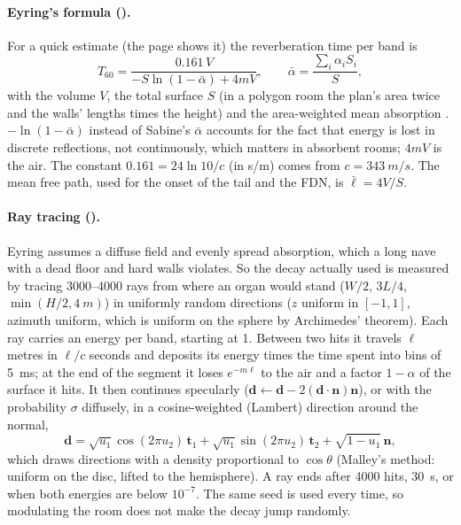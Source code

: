 \paragraph{Eyring's formula ().} For a quick estimate (the page shows it) the reverberation time per band is
\begin{equation}
  T_{60} = \frac{0.161\,V}{-S\ln(1-\bar\alpha) + 4mV},\qquad \bar\alpha = \frac{\sum_i\alpha_iS_i}{S},
\end{equation}
with the volume $V$, the total surface $S$ (in a polygon room the plan's area twice and the walls' lengths times the
height) and the area-weighted mean absorption \citep{eyring1930}. $-\ln(1-\bar\alpha)$ instead of Sabine's
$\bar\alpha$ accounts for the fact that energy is lost in discrete reflections, not continuously, which matters in
absorbent rooms; $4mV$ is the air. The constant $0.161 = 24\ln 10/c$ (in s/m) comes from $c = \SI{343}{m/s}$. The
mean free path, used for the onset of the tail and the FDN, is $\bar\ell = 4V/S$.

\paragraph{Ray tracing ().} Eyring assumes a diffuse field and evenly spread absorption, which a long nave
with a dead floor and hard walls violates. So the decay actually used is measured by tracing 3000--4000 rays from
where an organ would stand ($W/2$, $3L/4$, $\min(H/2, \SI{4}{m})$) in uniformly random directions ($z$ uniform in
$[-1,1]$, azimuth uniform, which is uniform on the sphere by Archimedes' theorem). Each ray carries an energy per band,
starting at 1. Between two hits it travels $\ell$ metres in $\ell/c$ seconds and deposits its energy times the time
spent into bins of \SI{5}{ms}; at the end of the segment it loses $e^{-m\ell}$ to the air and a factor $1-\alpha$ of the
surface it hits. It then continues specularly ($\mathbf d \leftarrow \mathbf d - 2(\mathbf d\cdot\mathbf n)\mathbf n$),
or with the probability $\sigma$ diffusely, in a cosine-weighted (Lambert) direction around the normal,
\begin{equation}
  \mathbf d = \sqrt{u_1}\cos(2\pi u_2)\,\mathbf t_1 + \sqrt{u_1}\sin(2\pi u_2)\,\mathbf t_2 + \sqrt{1-u_1}\,\mathbf n,
\end{equation}
which draws directions with a density proportional to $\cos\theta$ (Malley's method: uniform on the disc, lifted to the
hemisphere). A ray ends after 4000 hits, \SI{30}{s}, or when both energies are below $10^{-7}$. The same seed is used
every time, so modulating the room does not make the decay jump randomly.

